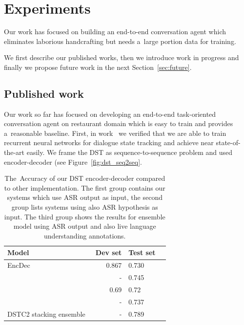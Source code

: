 \documentclass[11pt]{article}
\begin{document}
\section{Experiments}\label{sec:experiments}
Our work has focused on building an end-to-end conversation agent which eliminates laborious handcrafting but needs a~large portion data for training. 

We first describe our published works, then we introduce work in progress and finally we propose future work in the next Section~\ref{sec:future}. 

\subsection{Published work}\label{sec:published}
Our work so far has focused on developing an end-to-end task-oriented conversation agent on restaurant domain which is easy to train and provides a~reasonable baseline.
First, in work~\cite{platek_recurrent_2016} we verified that we are able to train recurrent neural networks for dialogue state tracking and achieve near state-of-the-art easily. 
We frame the DST as sequence-to-sequence problem and used encoder-decoder (see Figure~\ref{fig:dst_seq2seq}. 

\begin{table}[tb]
\begin{center}
\begin{tabular}{l@{\quad}rll}
\hline
Model & Dev set & Test set\\
[2pt] \hline\rule{0pt}{12pt}
    EncDec  &   0.867 & 0.730 \\
\hline
    \cite{vodolan_hybrid_2015} & - & 0.745 \\
    \cite{zilka_incremental_2015} & 0.69 & 0.72 \\
    \cite{henderson2013deep} & - & 0.737 \\
\hline
    DSTC2 stacking ensemble~\cite{henderson2014second} & - & 0.789 \\
\hline
\end{tabular}
\caption{The~Accuracy of our DST encoder-decoder compared to other implementation. The first group contains our systems which use ASR output as input, the second group lists systems using also ASR hypothesis as input. The third group shows the results for ensemble model using ASR output and also live language understanding annotations.}
\end{center}
\label{tab:dstc}
\end{table}
\end{document}
